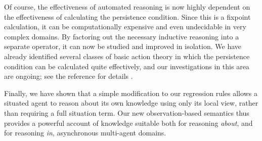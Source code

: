 Of course, the effectiveness of automated reasoning is now highly
dependent on the effectiveness of calculating the persistence condition.
Since this is a fixpoint calculation, it can be computationally expensive
and even undecidable in very complex domains. By factoring out the
necessary inductive reasoning into a separate operator, it can now
be studied and improved in isolation. We have already identified several
classes of basic action theory in which the persistence condition
can be calculated quite effectively, and our investigations in this
area are ongoing; see the reference for details \citep{kelly07sc_persistence}.

Finally, we have shown that a simple modification to our regression
rules allows a situated agent to reason about its own knowledge using
only its local view, rather than requiring a full situation term.
Our new observation-based semantics thus provides a powerful account
of knowledge suitable both for reasoning \emph{about}, and for reasoning
\emph{in}, asynchronous multi-agent domains.

